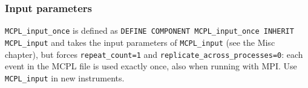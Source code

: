 \subsubsection*{Input parameters}
\texttt{MCPL\_input\_once} is defined as
\texttt{DEFINE COMPONENT MCPL\_input\_once INHERIT MCPL\_input} and takes
the input parameters of \texttt{MCPL\_input} (see the Misc chapter), but forces
\texttt{repeat\_count=1} and \texttt{replicate\_across\_processes=0}: each
event in the MCPL file is used exactly once, also when running with MPI.
Use \texttt{MCPL\_input} in new instruments.
